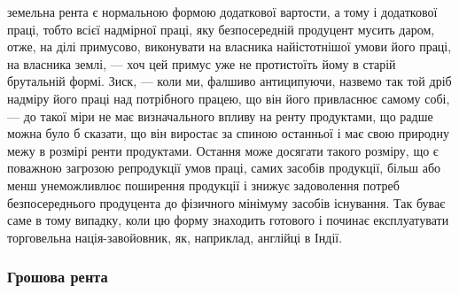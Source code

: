 \parcont{}  %
земельна рента є нормальною формою додаткової вартости, а тому і додаткової
праці, тобто всієї надмірної праці, яку безпосередній продуцент мусить даром,
отже, на ділі примусово, виконувати на власника найістотнішої умови його
праці, на власника землі, — хоч цей примус уже не протистоїть йому в старій
брутальній формі. Зиск, — коли ми, фалшиво антиципуючи, назвемо так той
дріб надміру його праці над потрібного працею, що він його привласнює самому
собі, — до такої міри не має визначального впливу на ренту продуктами, що
радше можна було б сказати, що він виростає за спиною останньої і має свою
природну межу в розмірі ренти продуктами. Остання може досягати такого
розміру, що є поважною загрозою репродукції умов праці, самих засобів продукції,
більш або менш унеможливлює поширення продукції і знижує задоволення
потреб безпосереднього продуцента до фізичного мінімуму засобів
існування. Так буває саме в тому випадку, коли цю форму знаходить готового
і починає експлуатувати торговельна нація-завойовник, як, наприклад, англійці
в Індії.

\subsubsection{Грошова рента}

